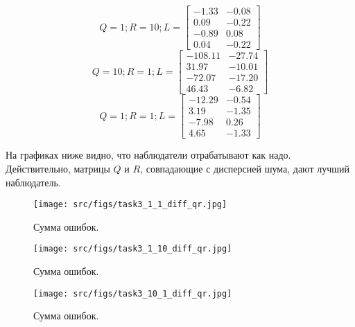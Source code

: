 \[Q = 1; R = 10; L = \begin{bmatrix}
        -1.33 & -0.08\\
         0.09 & -0.22\\
        -0.89 &  0.08\\
         0.04 & -0.22
       \end{bmatrix}\]
       \[Q = 10; R = 1; L = \begin{bmatrix}
        -108.11 & -27.74\\
         31.97 & -10.01\\
        -72.07 & -17.20\\
         46.43 & -6.82
       \end{bmatrix}\]
       \[Q = 1; R = 1; L = \begin{bmatrix}
        -12.29 & -0.54\\
         3.19 & -1.35\\
        -7.98 &  0.26\\
         4.65 & -1.33
       \end{bmatrix}\]

На графиках ниже видно, что наблюдатели отрабатывают как надо. Действительно, матрицы \(Q\) и \(R\), совпадающие с дисперсией шума, дают лучший наблюдатель.
\begin{figure}[ht!]
  \centering
  \texttt{[image: src/figs/task3\_1\_1\_diff\_qr.jpg]}
  \caption{Сумма ошибок.}
  \label{fig:task3_4}
\end{figure}
\begin{figure}[ht!]
        \centering
        \texttt{[image: src/figs/task3\_1\_10\_diff\_qr.jpg]}
        \caption{Сумма ошибок.}
        \label{fig:task3_5}
\end{figure}
\begin{figure}[ht!]
\centering
\texttt{[image: src/figs/task3\_10\_1\_diff\_qr.jpg]}
\caption{Сумма ошибок.}
\label{fig:task3_6}
\end{figure}

\FloatBarrier